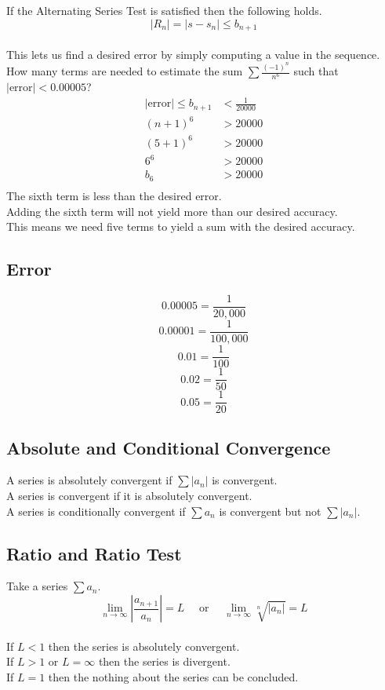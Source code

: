 \documentclass[12pt]{article}
\begin{document}
If the Alternating Series Test is satisfied then the following holds.
\\
\begin{displaymath}
\left|R_n\right| = \left|s - s_n\right| \leq b_{n+1}
\end{displaymath}
\\
This lets us find a desired error by simply computing a value in the sequence.
\\
How many terms are needed to estimate the sum $\sum \frac{(-1)^n}{n^6}$ such that $|\text{error}| < 0.00005$?\\
\begin{align*}
\left|\text{error}\right| \leq b_{n+1} &< \frac{1}{20000}\\
(n+1)^6 &> 20000\\
(5+1)^6 &> 20000\\
    6^6 &> 20000\\
    b_6 &> 20000\\
\end{align*}
The sixth term is less than the desired error.\\
Adding the sixth term will not yield more than our desired accuracy.\\
This means we need five terms to yield a sum with the desired accuracy.


\subsection{Error}

$$0.00005 = \frac{1}{20,000}$$
$$0.00001 = \frac{1}{100,000}$$
$$0.01 = \frac{1}{100}$$
$$0.02 = \frac{1}{50}$$
$$0.05 = \frac{1}{20}$$


\subsection{Absolute and Conditional Convergence}

A series is absolutely convergent if $\sum \left|a_n\right|$ is convergent.\\
A series is convergent if it is absolutely convergent.\\
A series is conditionally convergent if $\sum a_n$ is convergent but not $\sum \left|a_n\right|$.\\


\subsection{Ratio and Ratio Test}

Take a series $\sum a_n$.
\\
\begin{displaymath}
    \lim_{n\to\infty} \left|\frac{a_{n+1}}{a_n}\right| = L\quad\text{ or }\quad
    \lim_{n\to\infty} \sqrt[n]{\left|a_n\right|} = L
\end{displaymath}
\\
If $L < 1$ then the series is absolutely convergent.\\
If $L > 1\text{ or }L = \infty$ then the series is divergent.\\
If $L = 1$ then the nothing about the series can be concluded.
\end{document}
